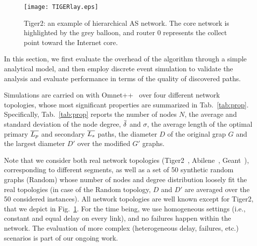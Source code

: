 \documentclass[conference]{IEEEtran}
\newcommand{\tiger}{Tiger2}
\begin{document}
\begin{figure}[t]
\begin{center}
\texttt{[image: TIGERlay.eps]}
\end{center}
\caption{\tiger: an example of hierarchical AS network.  The core network is highlighted by the grey balloon, and router 0 represents the collect point toward the Internet core.}
\label{fig:tiger}
\end{figure}

In this section, we first evaluate the overhead of the algorithm through a simple analytical model, and then employ discrete event simulation to validate the  analysis and evaluate performance in 
 terms of the quality of discovered paths.

Simulations are carried on with Omnet++~\cite{Varga10Omnet} over four
different network topologies, whose  most significant properties are summarized
in Tab.~\ref{tab:prop}.  
Specifically, Tab.~\ref{tab:prop} reports the number of nodes $N$, the
average and standard deviation of the node degree, $\bar{\delta}$ and $\sigma$,	the average length of the optimal primary $\overline{L_p}$ and secondary $\overline{L_s}$ paths, the diameter $D$ of the original grap $G$ and the largest diameter $D'$ over the modified $G'$ graphs. 

 Note that we consider both real network topologies (Tiger2~\cite{tiger2}, Abilene~\cite{abilene}, Geant~\cite{geant}), corresponding to different segments,  as well as a set of 50 synthetic random graphs (Random) whose number of nodes and degree distribution loosely fit the real topologies (in case of the Random topology,  $D$ and $D'$ are averaged over the 50 considered instances).
All network topologies are well known except for Tiger2, that we depict in Fig.~\ref{fig:tiger}. For the time being, we use homogeneous settings (i.e., constant and equal delay on every link), and no failures happen within the network. The evaluation of more complex (heterogeneous delay, failures, etc.) scenarios is part of our ongoing work.



 
 
\end{document}
